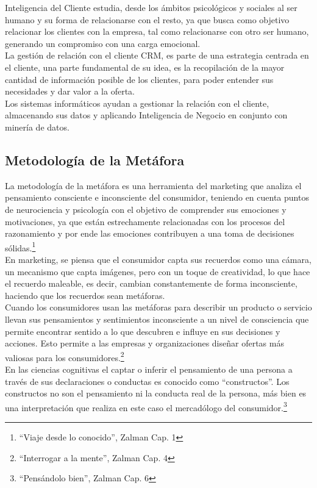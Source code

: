 Inteligencia del Cliente estudia, desde los ámbitos psicológicos y sociales al ser humano y su forma de relacionarse con el resto, ya que busca como objetivo relacionar los clientes con la empresa, tal como relacionarse con otro ser humano, generando un compromiso con una carga emocional.\\


La gestión de relación con el cliente CRM, es parte de una estrategia centrada en el cliente, una parte fundamental de su idea, es la recopilación de la mayor cantidad de información posible de los clientes, para poder entender sus necesidades y dar valor a la oferta.\cite{crm}\\


Los sistemas informáticos ayudan a gestionar la relación con el cliente, almacenando sus datos y aplicando Inteligencia de Negocio en conjunto con minería de datos.

\subsection{Metodología de la Metáfora}

La metodología de la metáfora es una herramienta del marketing que analiza el pensamiento consciente e inconsciente del consumidor, teniendo en cuenta puntos de neurociencia y psicología con el objetivo de comprender sus emociones y motivaciones, ya que están estrechamente relacionadas con los procesos del razonamiento y por ende las emociones contribuyen a una toma de decisiones sólidas.\footnote{``Viaje desde lo conocido'', Zalman Cap. 1}\\

En marketing, se piensa que el consumidor capta sus recuerdos como una cámara, un mecanismo que capta imágenes, pero con un toque de creatividad, lo que hace el recuerdo maleable, es decir, cambian constantemente de forma inconsciente, haciendo que los recuerdos sean metáforas. \\

Cuando los consumidores usan las metáforas para describir un producto o servicio llevan sus pensamientos y sentimientos inconsciente a un nivel de consciencia que permite encontrar sentido a lo que descubren e influye en sus decisiones y acciones. Esto permite a las empresas y organizaciones diseñar ofertas más valiosas para los consumidores.\footnote{``Interrogar a la mente'', Zalman Cap. 4}\\

En las ciencias cognitivas el captar o inferir el pensamiento de una persona a través de sus declaraciones o conductas es conocido como ``constructos''. Los constructos no son el pensamiento ni la conducta real de la persona, más bien es una interpretación que realiza en este caso el mercadólogo del consumidor.\footnote{``Pensándolo bien'', Zalman Cap. 6}\\

